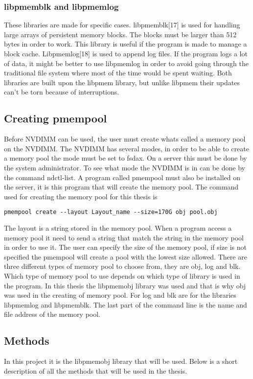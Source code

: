 \documentclass[12pt,a4paper,USenglish]{article}      %
\begin{document}
\subsubsection{libpmemblk and libpmemlog}
These libraries are made for specific cases. libpmemblk[17] is used for handling large arrays of persistent memory blocks. The blocks must be larger than 512 bytes in order to work. This library is useful if the program is made to manage a block cache. Libpmemlog[18] is used to append log files. If the program logs a lot of data, it might be better to use libpmemlog in order to avoid going through the traditional file system where most of the time would be spent waiting. Both libraries are built upon the libpmem library, but unlike libpmem their updates can’t be torn because of interruptions.

\subsection{Creating pmempool}
\label{section:memorypool}
Before NVDIMM can be used, the user must create whats called a memory pool on the NVDIMM. The NVDIMM has several modes, in order to be able to create a memory pool the mode must be set to fsdax. On a server this must be done by the system administrator. To see what mode the NVDIMM is in can be done by the command ndctl-list. A program called pmempool must also be installed on the server, it is this program that will create the memory pool.
The command used for creating the memory pool for this thesis is 
\begin{lstlisting}
pmempool create --layout Layout_name --size=170G obj pool.obj
\end{lstlisting}
The layout is a string stored in the memory pool. When a program access a memory pool it need to send a string that match the string in the memory pool in order to use it. The user can specify the size of the memory pool, if size is not specified the pmempool will create a pool with the lowest size allowed.
There are three different types of memory pool to choose from, they are obj, log and blk. Which type of memory pool to use depends on which type of library is used in the program. In this thesis the libpmemobj library was used and that is why obj was used in the creating of memory pool. For log and blk are for the libraries libpmemlog and libpmemblk.
The last part of the command line is the name and file address of the memory pool.

\subsection{Methods}
In this project it is the libpmemobj library that will be used. Below is a short description of all the methods that will be used in the thesis. 
\end{document}
